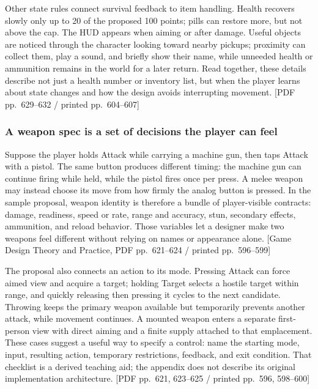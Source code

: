 Other state rules connect survival feedback to item handling. Health recovers slowly only up to 20 of the proposed 100 points; pills can restore more, but not above the cap. The HUD appears when aiming or after damage. Useful objects are noticed through the character looking toward nearby pickups; proximity can collect them, play a sound, and briefly show their name, while unneeded health or ammunition remains in the world for a later return. Read together, these details describe not just a health number or inventory list, but when the player learns about state changes and how the design avoids interrupting movement. {[}PDF pp.~629--632 / printed pp.~604--607{]}

\subsubsection{A weapon spec is a set of decisions the player can feel}\label{05-engine-i-ch009-a-weapon-spec-is-a-set-of-decisions-the-player-can-feel}

\hypertarget{05-engine-i-ch009-a-weapon-spec-is-a-set-of-decisions-the-player-can-feel}{}

Suppose the player holds Attack while carrying a machine gun, then taps Attack with a pistol. The same button produces different timing: the machine gun can continue firing while held, while the pistol fires once per press. A melee weapon may instead choose its move from how firmly the analog button is pressed. In the sample proposal, weapon identity is therefore a bundle of player-visible contracts: damage, readiness, speed or rate, range and accuracy, stun, secondary effects, ammunition, and reload behavior. Those variables let a designer make two weapons feel different without relying on names or appearance alone. {[}Game Design Theory and Practice, PDF pp.~621--624 / printed pp.~596--599{]}

The proposal also connects an action to its mode. Pressing Attack can force aimed view and acquire a target; holding Target selects a hostile target within range, and quickly releasing then pressing it cycles to the next candidate. Throwing keeps the primary weapon available but temporarily prevents another attack, while movement continues. A mounted weapon enters a separate first-person view with direct aiming and a finite supply attached to that emplacement. These cases suggest a useful way to specify a control: name the starting mode, input, resulting action, temporary restrictions, feedback, and exit condition. That checklist is a derived teaching aid; the appendix does not describe its original implementation architecture. {[}PDF pp.~621, 623--625 / printed pp.~596, 598--600{]}

